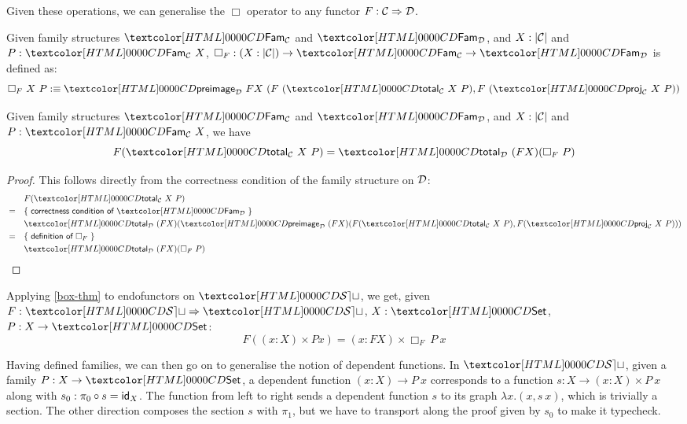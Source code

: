 Given these operations, we can generalise the $\Box$ operator to any
functor $F : \mathcal{C} \Rightarrow \mathcal{D}$.

\begin{definition}
  Given family structures $\Fam_{\Cc}$ and $\Fam_{\Dd}$, and
  $X : | \mathcal{C} |$ and $P : \Fam_{\Cc}\ X$,
  $\Box_F : (X : | \Cc |) \to \Fam_{\Cc} \to \Fam_{\Dd}$ is defined
  as:
  $$
  \Box_F\ X\ P \ddefeq \preimage_{\Dd}\ FX\ (F\ (\total_{\Cc}\ X\ P) ,
  F\ (\proj_{\Cc}\ X\ P))
  $$
\end{definition}

\begin{proposition}
  \label{box-thm}
  Given family structures $\Fam_{\Cc}$ and $\Fam_{\Dd}$, and
  $X : | \mathcal{C} |$ and $P : \Fam_{\Cc}\ X$, we have
  $$
  F (\total_{\Cc}\ X\ P) = \total_{\Dd}\ (F X) (\Box_F\ P)
  $$
\end{proposition}

\begin{proof}
  This follows directly from the correctness condition of the family
  structure on $\mathcal{D}$:
  \begin{align*}
    &&&F (\total_{\Cc}\ X\ P) \\
    &=& &\reasontext{correctness condition of $\Fam_{\Dd}$} \\
    &&&\total_{\Dd}\ (F X) (\preimage_{\Dd}\ (F X) (F (\total_{\Cc}\ X\ P), F (\proj_{\Cc}\ X\ P))) \\
    &=& &\reasontext{definition of $\Box_F$} \\
    &&&\total_{\Dd}\ (F X) (\Box_F\ P)
  \end{align*}
\end{proof}

\begin{corollary}
  Applying \cref{box-thm} to endofunctors on $\SET$, we get, given
  $F : \Func{\SET}{\SET}$, $X : \Set$, $P : X \to \Set$:
  $$
  F ((x : X) \times P x) = (x : FX) \times \Box_F\ P\ x
  $$
\end{corollary}

Having defined families, we can then go on to generalise the notion of
dependent functions. In $\SET$, given a family $P : X \to \Set$, a
dependent function $(x : X) \to P\ x$ corresponds to a function
$s : X \to (x : X) \times P\ x$ along with
$s_0 : \pi_0 \circ s = \id_X$. The function from left to right sends a
dependent function $s$ to its graph $\lambda x . (x , s\ x)$, which is
trivially a section. The other direction composes the section $s$ with
$\pi_1$, but we have to transport along the proof given by $s_0$ to
make it typecheck.

